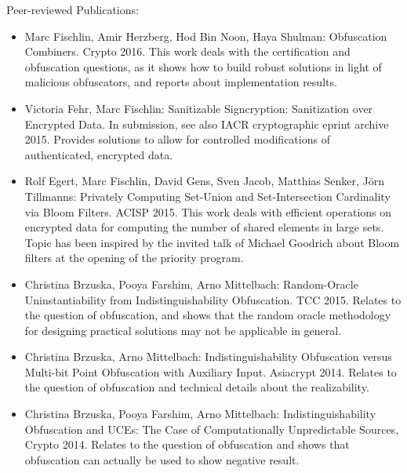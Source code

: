 \noindent
Peer-reviewed Publications:
\begin{itemize}
 \item   Marc Fischlin, Amir Herzberg, Hod Bin Noon, Haya Shulman:
Obfuscation Combiners. Crypto 2016. This work deals with the certification and obfuscation questions, as it shows how to build robust solutions in light of malicious obfuscators, and reports about implementation results.
%
\item 
Victoria Fehr, Marc Fischlin:
Sanitizable Signcryption: Sanitization over Encrypted Data. In submission, see also IACR cryptographic eprint archive 2015. Provides solutions to allow for controlled modifications of authenticated, encrypted data.
%
\item Rolf Egert, Marc Fischlin, David Gens, Sven Jacob, Matthias Senker, J\"orn Tillmanns: Privately Computing Set-Union and Set-Intersection Cardinality via Bloom Filters. ACISP 2015. This work deals with efficient operations on encrypted data for computing the number of shared elements in large sets. Topic has been inspired by the invited talk of Michael Goodrich about Bloom filters at the opening of the priority program.
%
\item Christina Brzuska, Pooya Farshim, Arno Mittelbach:
Random-Oracle Uninstantiability from Indistinguishability Obfuscation. TCC 2015. Relates to the question of obfuscation, and shows that the random oracle methodology for designing practical solutions may not be applicable in general.
%
\item Christina Brzuska, Arno Mittelbach:
Indistinguishability Obfuscation versus Multi-bit Point Obfuscation with Auxiliary Input. Asiacrypt 2014. Relates to the question of obfuscation and technical details about the realizability.
%
\item 
Christina Brzuska, Pooya Farshim, Arno Mittelbach:
Indistinguishability Obfuscation and UCEs: The Case of Computationally Unpredictable Sources, Crypto 2014. Relates to the question of obfuscation and shows that obfuscation can actually be used to show negative result.
%
\end{itemize}
%

